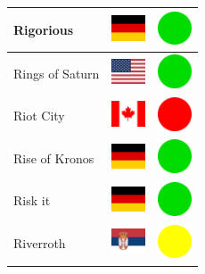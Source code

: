 \documentclass[12pt, a4paper, twoside]{report}
\begin{document}
\begin{center}
\begin{longtable}{|p{5cm}|p{2cm}|p{2cm}|}
 Rigorious                                                  & \includegraphics[width=1cm]{../img/flags/de} &   \includegraphics[width=1cm]{../likes/y} \\ \hline
 Rings of Saturn                                            & \includegraphics[width=1cm]{../img/flags/us} &   \includegraphics[width=1cm]{../likes/y} \\ \hline
 Riot City                                                  & \includegraphics[width=1cm]{../img/flags/ca} &   \includegraphics[width=1cm]{../likes/n} \\ \hline
 Rise of Kronos                                             & \includegraphics[width=1cm]{../img/flags/de} &   \includegraphics[width=1cm]{../likes/y} \\ \hline
 Risk it                                                    & \includegraphics[width=1cm]{../img/flags/de} &   \includegraphics[width=1cm]{../likes/y} \\ \hline
 Riverroth                                                  & \includegraphics[width=1cm]{../img/flags/rs} &   \includegraphics[width=1cm]{../likes/m} \\ \hline

\end{longtable}
\end{center}
\end{document}
